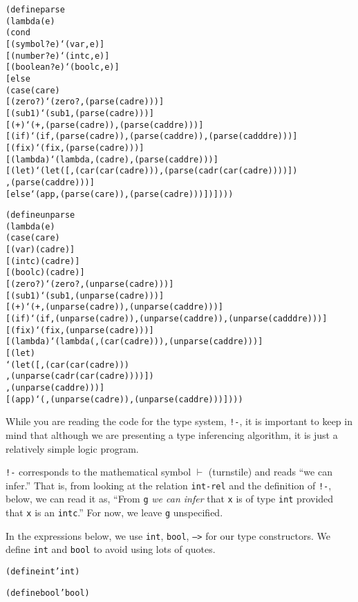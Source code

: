 \begin{alltt}
(define parse
  (lambda (e)
    (cond
      [(symbol? e) `(var ,e)]
      [(number? e) `(intc ,e)]
      [(boolean? e) `(boolc ,e)]
      [else 
        (case (car e)
          [(zero?) `(zero? ,(parse (cadr e)))]
          [(sub1) `(sub1 ,(parse (cadr e)))]
          [(+) `(+ ,(parse (cadr e)) ,(parse (caddr e)))]
          [(if) `(if ,(parse (cadr e)) ,(parse (caddr e)) ,(parse (cadddr e)))]
          [(fix) `(fix ,(parse (cadr e)))]
          [(lambda) `(lambda ,(cadr e) ,(parse (caddr e)))]
          [(let) `(let ([,(car (car (cadr e))) ,(parse (cadr (car (cadr e))))])
                    ,(parse (caddr e)))]
          [else `(app ,(parse (car e)) ,(parse (cadr e)))])])))
\end{alltt}
\newpage
\begin{alltt}
(define unparse
  (lambda (e)
    (case (car e)
      [(var) (cadr e)]
      [(intc) (cadr e)]
      [(boolc) (cadr e)]
      [(zero?) `(zero? ,(unparse (cadr e)))]
      [(sub1) `(sub1 ,(unparse (cadr e)))]
      [(+) `(+ ,(unparse (cadr e)) ,(unparse (caddr e)))]
      [(if) `(if ,(unparse (cadr e)) ,(unparse (caddr e)) ,(unparse (cadddr e)))]
      [(fix) `(fix ,(unparse (cadr e)))]
      [(lambda) `(lambda (,(car (cadr e))) ,(unparse (caddr e)))]
      [(let) 
       `(let ([,(car (car (cadr e)))
               ,(unparse (cadr (car (cadr e))))])
          ,(unparse (caddr e)))]
      [(app) `(,(unparse (cadr e)) ,(unparse (caddr e)))])))
\end{alltt}

While you are reading the code for the type system, \texttt{!-}, it is
important to keep in mind that although we are presenting a type
inferencing algorithm, it is just a relatively simple logic program.

\texttt{!-} corresponds to the mathematical symbol $\vdash$
(turnstile) and reads ``we can infer.''  That is, from looking at the
relation \texttt{int-rel} and the definition of \texttt{!-}, below, we
can read it as, ``From \texttt{g} \emph{we can infer} that \texttt{x}
is of type \texttt{int} provided that \texttt{x} is an \texttt{intc}.''
For now, we leave \texttt{g} unspecified.

In the expressions below, we use \texttt{int}, \texttt{bool},
\texttt{-->} for our type constructors.  We define \texttt{int}
and \texttt{bool} to avoid using lots of quotes.

\begin{alltt}
(define int 'int)

(define bool 'bool)
\end{alltt}

